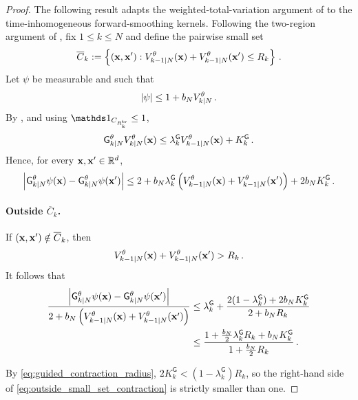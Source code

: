 \documentclass[11pt]{article}
\theoremstyle{plain}
\theoremstyle{definition}
\theoremstyle{remark}
\begin{document}
\begin{proof}
The following result adapts the weighted-total-variation
argument of \citet{HairerMattingly2008} to the time-inhomogeneous
forward-smoothing kernels. Following the two-region argument of
\citet{HairerMattingly2008}, fix $1\le k\le N$ and define the pairwise small set
$$
\overline C_k \eqdef \left\{ (\x,\x'): \twistedlyap{k-1}{N}[\theta](\x) + \twistedlyap{k-1}{N}[\theta](\x') \le R_k \right\} \eqsp.
$$
Let $\psi$ be measurable and such that
$$
|\psi| \le 1 + b_N \twistedlyap{k}{N}[\theta] \eqsp.
$$
By , and using
$\un_{C_{R_k^{\rm tr}}}\le1$,
$$
\fsmk{k}{N}[\theta] \twistedlyap{k}{N}[\theta](\x) \le \lambda_k^{\mathsf G} \twistedlyap{k-1}{N}[\theta](\x) + K_k^{\mathsf G} \eqsp.
$$
Hence, for every $\mathbf{x},\mathbf{x}'\in\mathbb{R}^d$,
\begin{align}
\label{eq:pointwise_drift_contraction}
\left| \fsmk{k}{N}[\theta]\psi(\x) - \fsmk{k}{N}[\theta]\psi(\x') \right|
\le 2 + b_N \lambda_k^{\mathsf G} \left( \twistedlyap{k-1}{N}[\theta](\x) + \twistedlyap{k-1}{N}[\theta](\x') \right) + 2 b_N K_k^{\mathsf G} \eqsp.
\end{align}

\paragraph{Outside $\overline C_k$.}
If $(\mathbf{x},\mathbf{x}')\notin\overline C_k$, then
$$
\twistedlyap{k-1}{N}[\theta](\x) + \twistedlyap{k-1}{N}[\theta](\x') > R_k \eqsp.
$$
It follows that 
\begin{align}
\label{eq:outside_small_set_contraction}
\frac{ \left| \fsmk{k}{N}[\theta]\psi(\x) - \fsmk{k}{N}[\theta]\psi(\x') \right| }{ 2+ b_N \left( \twistedlyap{k-1}{N}[\theta](\x) + \twistedlyap{k-1}{N}[\theta](\x') \right)} 
&  \le \lambda_k^{\mathsf G} + \frac{ 2(1-\lambda_k^{\mathsf G})+2b_NK_k^{\mathsf G} }{ 2+b_NR_k } \nonumber \\ 
& \le \frac{ 1+\frac{b_N}{2}\lambda_k^{\mathsf G}R_k + b_NK_k^{\mathsf G} }{ 1+\frac{b_N}{2}R_k} \eqsp.
\end{align}

By \eqref{eq:guided_contraction_radius}, $2K_k^{\mathsf G} < (1-\lambda_k^{\mathsf G})R_k$, so the right-hand side of
\eqref{eq:outside_small_set_contraction} is strictly smaller than one.



\end{proof}
\end{document}

